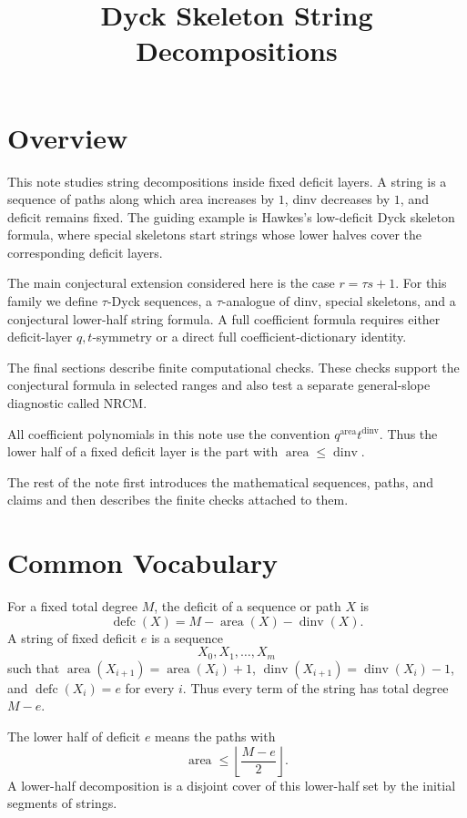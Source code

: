 \documentclass{article}
\title{Dyck Skeleton String Decompositions}
\author{}
\date{}
\newcommand{\defc}{\operatorname{defc}}
\newcommand{\dinv}{\operatorname{dinv}}
\newcommand{\area}{\operatorname{area}}
\begin{document}
\maketitle

\section{Overview}

This note studies string decompositions inside fixed deficit layers.  A string
is a sequence of paths along which area increases by \(1\), dinv decreases by
\(1\), and deficit remains fixed.  The guiding example is Hawkes's
low-deficit Dyck skeleton formula, where special skeletons start strings whose
lower halves cover the corresponding deficit layers.

The main conjectural extension considered here is the case \(r=\tau s+1\).
For this family we define \(\tau\)-Dyck sequences, a \(\tau\)-analogue of
dinv, special skeletons, and a conjectural lower-half string formula.  A full
coefficient formula requires either deficit-layer \(q,t\)-symmetry or a direct
full coefficient-dictionary identity.

The final sections describe finite computational checks.  These checks support
the conjectural formula in selected ranges and also test a separate
general-slope diagnostic called NRCM.

All coefficient polynomials in this note use the convention
\(q^{\area}t^{\dinv}\).  Thus the lower half of a fixed deficit layer is the
part with \(\area\le\dinv\).

The rest of the note first introduces the mathematical sequences, paths, and
claims and then describes the finite checks attached to them.

\section{Common Vocabulary}

For a fixed total degree \(M\), the deficit of a sequence or path \(X\) is
\[
  \defc(X)=M-\area(X)-\dinv(X).
\]
A string of fixed deficit \(e\) is a sequence
\[
  X_0,X_1,\ldots,X_m
\]
such that \(\area(X_{i+1})=\area(X_i)+1\),
\(\dinv(X_{i+1})=\dinv(X_i)-1\), and \(\defc(X_i)=e\) for every \(i\).
Thus every term of the string has total degree \(M-e\).

The lower half of deficit \(e\) means the paths with
\[
  \area\le \left\lfloor\frac{M-e}{2}\right\rfloor.
\]
A lower-half decomposition is a disjoint cover of this lower-half set by the
initial segments of strings.
\end{document}
